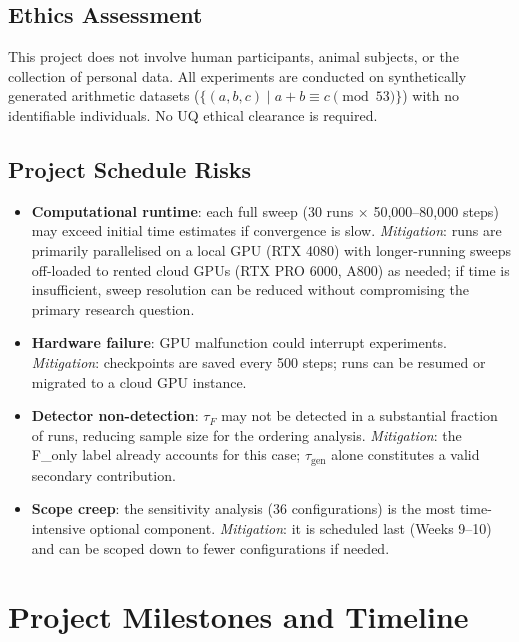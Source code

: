 \documentclass[12pt,openany,oneside,a4paper]{book}
\newcommand{\taug}{\tau_{\mathrm{gen}}}
\newcommand{\tauf}{\tau_{F}}
\begin{document}
\subsection{Ethics Assessment}

This project does not involve human participants, animal subjects,
or the collection of personal data.
All experiments are conducted on synthetically generated arithmetic
datasets ($\{(a,b,c) \mid a+b \equiv c \pmod{53}\}$) with no
identifiable individuals.
No UQ ethical clearance is required.

\subsection{Project Schedule Risks}

\begin{itemize}
  \item \textbf{Computational runtime}: each full sweep (30 runs
    $\times$ 50{,}000--80{,}000 steps) may exceed initial time
    estimates if convergence is slow.
    \textit{Mitigation}: runs are primarily parallelised on a local
    GPU (RTX 4080) with longer-running sweeps off-loaded to rented
    cloud GPUs (RTX PRO 6000, A800) as needed;
    if time is insufficient, sweep resolution can be reduced without
    compromising the primary research question.
  \item \textbf{Hardware failure}: GPU malfunction could interrupt
    experiments.
    \textit{Mitigation}: checkpoints are saved every 500 steps; runs
    can be resumed or migrated to a cloud GPU instance.
  \item \textbf{Detector non-detection}: $\tauf$ may not be detected
    in a substantial fraction of runs, reducing sample size for the
    ordering analysis.
    \textit{Mitigation}: the F\_only label already accounts for this
    case; $\taug$ alone constitutes a valid secondary contribution.
  \item \textbf{Scope creep}: the sensitivity analysis (36 configurations)
    is the most time-intensive optional component.
    \textit{Mitigation}: it is scheduled last (Weeks 9--10) and can
    be scoped down to fewer configurations if needed.
\end{itemize}

\section{Project Milestones and Timeline}
\label{sec:milestones}
\end{document}
